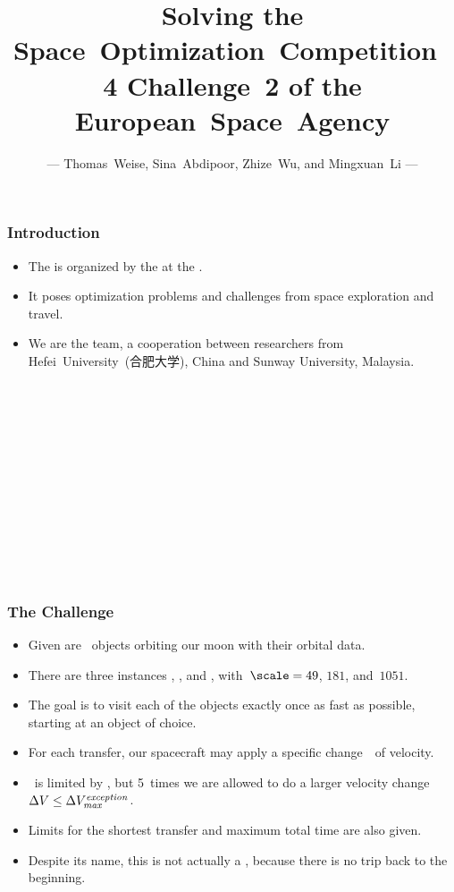 \documentclass[aspectratio=169,mathserif,notheorems]{beamer}%
\title{Solving the \mbox{Space Optimization Competition~4} Challenge~2 of the \mbox{European Space Agency}}%
\subtitle{\normalsize{--- \mbox{Thomas Weise}, \mbox{Sina Abdipoor}, \mbox{Zhize Wu}, and \mbox{Mingxuan Li} ---}}%
\begin{document}
%
\global\let\outlineSlide\relax%
\startPresentation%
%
%
\begin{frame}[t]%
\frametitle{Introduction}%
%
\begin{itemize}%
%
\item The  is organized by the  at the .%
%
\item<2-> It poses optimization problems and challenges from space exploration and travel.%
%
\item<3-> We are the \mbox{\team} team, a cooperation between researchers from \mbox{Hefei University~(合肥大学)}, China and Sunway University, Malaysia.%
\end{itemize}%
%
\strut\\\strut\\\strut\\\strut\\\strut\\\strut\\\strut%
\strut\dotfill\strut\\%
\tiny{}%
%
%
%
%
%
\end{frame}%
%
\begin{frame}%
\frametitle{The Challenge}%
\begin{itemize}%
\item Given are \scale~objects orbiting our moon with their orbital data.%
%
\item<2-> There are three instances \instS, \instM, and \instL, with~$\scale=49$, $181$, and~$1051$.%
%
\item<3-> The goal is to visit each of the objects exactly once as fast as possible, starting at an object of choice.%
%
\item<4-> For each transfer, our spacecraft may apply a specific change~\dV\ of velocity.%
%
\item<5-> \dV\ is limited by \dVmax, but 5~times we are allowed to do a larger velocity change~${\Delta}V\leq{\Delta}V_{\mathit{max}}^{\mathit{exception}}$.%
%
\item<6-> Limits for the shortest transfer and maximum total time are also given.%
%
\item<7-> Despite its name, this is not actually a , because there is no trip back to the beginning.%
\end{itemize}%
\end{frame}%
\end{document}
